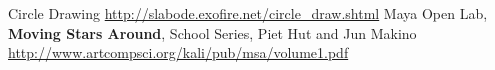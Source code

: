 \begin{thebibliography}{1}
Circle Drawing \url{http://slabode.exofire.net/circle_draw.shtml}
Maya Open Lab, \textbf{Moving Stars Around}, School Series, Piet Hut and Jun Makino \url{http://www.artcompsci.org/kali/pub/msa/volume1.pdf}
\end{thebibliography}
